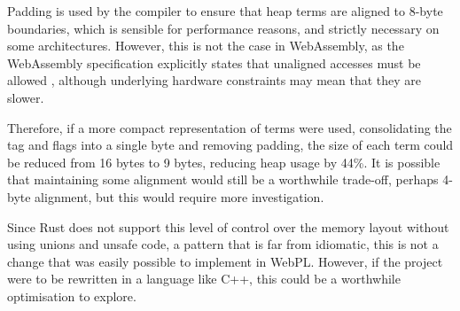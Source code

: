 Padding is used by the compiler to ensure that heap terms are aligned to 8-byte boundaries, which is sensible for performance reasons, and strictly necessary on some architectures. However, this is not the case in WebAssembly, as the WebAssembly specification explicitly states that unaligned accesses must be allowed \cite{rossbergWebAssemblyCoreSpecification2022}, although underlying hardware constraints may mean that they are slower.

Therefore, if a more compact representation of terms were used, consolidating the tag and flags into a single byte and removing padding, the size of each term could be reduced from 16 bytes to 9 bytes, reducing heap usage by 44\%. It is possible that maintaining some alignment would still be a worthwhile trade-off, perhaps 4-byte alignment, but this would require more investigation.

Since Rust does not support this level of control over the memory layout without using unions and unsafe code, a pattern that is far from idiomatic, this is not a change that was easily possible to implement in WebPL. However, if the project were to be rewritten in a language like C++, this could be a worthwhile optimisation to explore.
